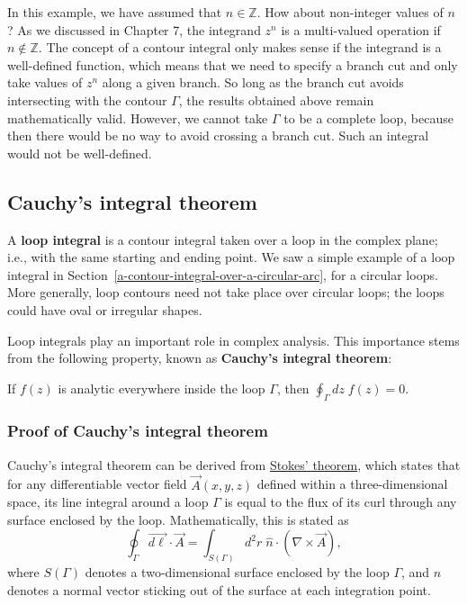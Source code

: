 \documentclass[10pt,a4paper]{article}
\begin{document}
In this example, we have assumed that $n \in \mathbb{Z}$. How about
non-integer values of $n$?  As we discussed in Chapter 7, the
integrand $z^n$ is a multi-valued operation if $n
\notin\mathbb{Z}$. The concept of a contour integral only makes sense
if the integrand is a well-defined function, which means that we need
to specify a branch cut and only take values of $z^n$ along a given
branch. So long as the branch cut avoids intersecting with the contour
$\Gamma$, the results obtained above remain mathematically
valid. However, we cannot take $\Gamma$ to be a complete loop, because
then there would be no way to avoid crossing a branch cut. Such an
integral would not be well-defined.

\subsection{Cauchy's integral theorem}\label{cauchys-integral-theorem}

A \textbf{loop integral} is a contour integral taken over a loop in
the complex plane; i.e., with the same starting and ending point. We
saw a simple example of a loop integral in
Section~\ref{a-contour-integral-over-a-circular-arc}, for a circular
loops. More generally, loop contours need not take place over circular
loops; the loops could have oval or irregular shapes.

Loop integrals play an important role in complex analysis. This
importance stems from the following property, known as \textbf{Cauchy's
integral theorem}:

\begin{framed} \noindent
If $f(z)$ is analytic everywhere inside the loop $\Gamma$, then
$\displaystyle\oint_\Gamma dz\; f(z) = 0.$
\end{framed}

\subsubsection{Proof of Cauchy's integral theorem}
\label{proof-of-cauchys-integral-theorem}

Cauchy's integral theorem can be derived from
\href{http://en.wikipedia.org/wiki/Stokes'_theorem}{Stokes' theorem},
which states that for any differentiable vector field $\vec{A}(x,y,z)$
defined within a three-dimensional space, its line integral around a
loop $\Gamma$ is equal to the flux of its curl through any surface
enclosed by the loop. Mathematically, this is stated as
\begin{equation}
\oint_\Gamma \vec{d\ell} \cdot \vec{A} = \int_{S(\Gamma)} d^2r \; \hat{n} \cdot \left(\nabla \times \vec{A}\right),
\end{equation}
where $S(\Gamma)$ denotes a two-dimensional surface enclosed by the
loop $\Gamma$, and $\hat{n}$ denotes a normal vector sticking out of
the surface at each integration point.
\end{document}
